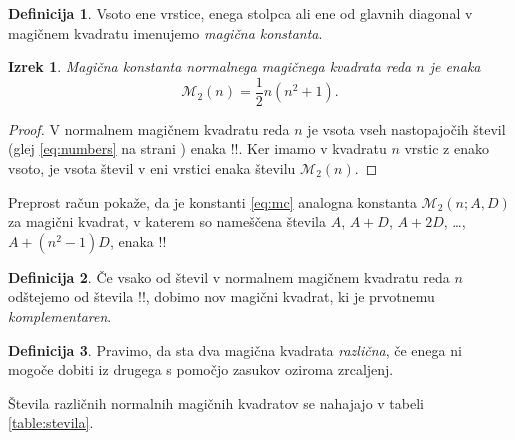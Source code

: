 \documentclass[a4paper,12pt]{article}
\newcommand{\m}{\mathcal{M}_2}
\theoremstyle{definition}
\newtheorem{definicija}{Definicija}
\theoremstyle{plain}
\newtheorem{izrek}{Izrek}
\begin{document}
\begin{definicija}
      Vsoto ene vrstice, enega stolpca ali ene od glavnih diagonal
      v magičnem kvadratu imenujemo \emph{magična konstanta}.
\end{definicija}

   
   \begin{izrek}
      Magična konstanta normalnega magičnega kvadrata reda \(n\)
      je enaka
      \begin{equation}
         \label{eq:mc}
         \m(n) = \frac{1}{2} n (n^2 + 1).
      \end{equation}
   \end{izrek}

   
   \begin{proof}
      V normalnem magičnem kvadratu reda \(n\) je vsota vseh nastopajočih
      števil (glej \eqref{eq:numbers} na strani \pageref{eq:numbers}) enaka
      !!. Ker imamo
      v kvadratu \(n\) vrstic z enako vsoto, je vsota števil v eni vrstici
      enaka številu \(\m(n)\). %
   \end{proof}

Preprost račun pokaže, da je konstanti \eqref{eq:mc} analogna konstanta
\(\m(n;A,D)\) za magični kvadrat, v katerem so nameščena števila
\(A\), \(A+D\), \(A+2D\), \ldots, \(A+(n^2-1)D\), enaka %
!!

\begin{definicija}
      Če vsako od števil v normalnem magičnem kvadratu reda \(n\) odštejemo
      od števila !!, dobimo nov magični kvadrat, ki je prvotnemu
      \emph{komplementaren}.
\end{definicija}

\begin{definicija}
      Pravimo, da sta dva magična kvadrata \emph{različna}, če enega ni mogoče dobiti
      iz drugega s pomočjo zasukov oziroma zrcaljenj.
\end{definicija}

Števila različnih normalnih magičnih kvadratov se nahajajo v tabeli \ref{table:stevila}.
\end{document}
